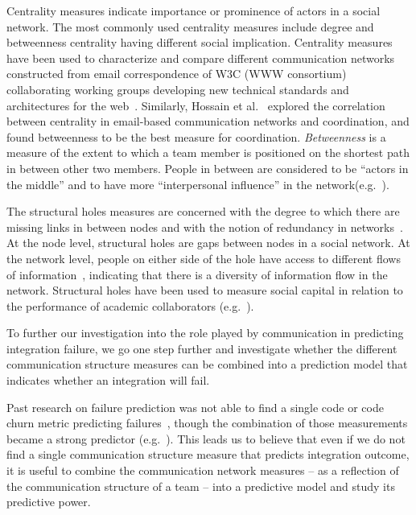 Centrality measures indicate importance or prominence of actors in a
social network. The most commonly used centrality measures include degree and
betweenness centrality having different social implication. Centrality measures
have been used to characterize and compare different communication networks
constructed from email correspondence of W3C (WWW consortium) collaborating
working groups developing new technical standards and architectures for the
web~\cite{Gloor:2003cikm}. Similarly, Hossain et al.~\cite{hossain:cscw:2006}
explored the correlation between centrality in email-based communication networks
and coordination, and found betweenness to be the best measure for coordination.
\emph{Betweenness} is a measure of the extent to which a team member is
positioned on the shortest path in between other two members. People in between
are considered to be ``actors in the middle'' and to have more ``interpersonal
influence'' in the
network(e.g.~\cite{Gloor:2003cikm,zimmermann:icse:2008,hossain:cscw:2006}).

The structural holes measures are concerned with the degree to which there
are missing links in between nodes and with the notion of redundancy in
networks~\cite{Burt:1995vo}. At the node level, structural holes are gaps between
nodes in a social network. At the network level, people on either side of the
hole have access to different flows of information~\cite{Hargadon:1997asq},
indicating that there is a diversity of information flow in the network.
Structural holes have been used to measure social capital in relation to the
performance of academic collaborators (e.g.~\cite{Brambila:PICMET2007}).

To further our investigation into the role played by communication in
predicting integration failure, we go one step further and investigate whether
the different communication structure measures can be combined into a prediction
model that indicates whether an integration will fail.

Past research on failure prediction was not able to find a single code or code
churn metric predicting
failures~\cite{nagappan:icse:2006,basili:1996tse,denaro:2002seke}, though the
combination of those measurements became a strong predictor
(e.g.~\cite{mockus:2000bell}). This leads us to believe that even if we do not
find a single communication structure measure that predicts integration outcome,
it is useful to combine the communication network measures -- as a reflection of
the communication structure of a team -- into a predictive model and study its
predictive power.

